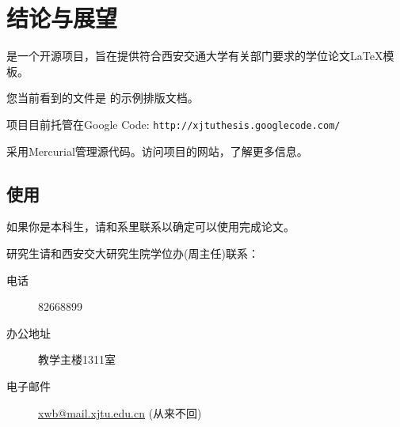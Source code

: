 %
%
%
%
%
%
%
%
\chapter{结论与展望}

    \xjtuthesis 是一个开源项目，旨在提供符合西安交通大学有关部门要求的学位论文\LaTeX 模板。

    您当前看到的文件是 \xjtuthesis{} \metaversion 的示例排版文档。

    \xjtuthesis 项目目前托管在Google Code: \verb|http://xjtuthesis.googlecode.com/|
    
    \xjtuthesis 采用Mercurial管理源代码。访问项目的网站，了解更多信息。

    \section{使用\xjtuthesis}

        如果你是本科生，请和系里联系以确定可以使用\xjtuthesis 完成论文。

        研究生请和西安交大研究生院学位办(周主任)联系：
        
        \begin{description}
            \item[电话] 82668899
            \item[办公地址] 教学主楼1311室
            \item[电子邮件] \url{xwb@mail.xjtu.edu.cn} (从来不回)
        \end{description}
